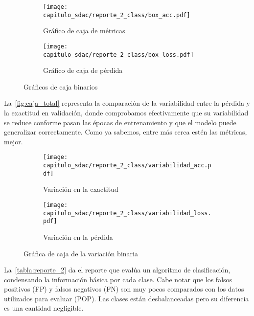 \begin{figure}[H]
    \centering
    \begin{subfigure}[b]{0.6\textwidth}
        \centering
        \texttt{[image: capitulo\_sdac/reporte\_2\_class/box\_acc.pdf]}
        \caption{Gráfico de caja de métricas}\label{fig:caja_acc2} 
    \end{subfigure}

    \begin{subfigure}[b]{0.6\textwidth}
        \centering
        \texttt{[image: capitulo\_sdac/reporte\_2\_class/box\_loss.pdf]}
        \caption{Gráfico de caja de pérdida}\label{fig:caja_loss2}
    \end{subfigure}
    \caption{Gráficos de caja binarios}\label{fig:caja_total2}
\end{figure}

La~\autoref{fig:caja_total} representa la comparación de la variabilidad entre
la pérdida y la exactitud en validación, donde comprobamos efectivamente que su
variabilidad se reduce conforme pasan las épocas de entrenamiento y que el
modelo puede generalizar correctamente. Como ya sabemos, entre más cerca estén
las métricas, mejor.

\begin{figure}[H]
    \centering
    \begin{subfigure}[b]{0.6\textwidth}
        \centering
        \texttt{[image: capitulo\_sdac/reporte\_2\_class/variabilidad\_acc.pdf]}
        \caption{Variación en la exactitud}\label{fig:caja_acc} 
    \end{subfigure}

    \begin{subfigure}[b]{0.6\textwidth}
        \centering
        \texttt{[image: capitulo\_sdac/reporte\_2\_class/variabilidad\_loss.pdf]}
        \caption{Variación en la pérdida}\label{fig:caja_loss}
    \end{subfigure}
    \caption{Gráfica de caja de la variación binaria}\label{fig:caja_total}
\end{figure}

La~\autoref{tabla:reporte_2} da el reporte que evalúa un algoritmo de
clasificación, condensando la información básica por cada clase. Cabe notar que
los falsos positivos (FP) y falsos negativos (FN) son muy pocos comparados con
los datos utilizados para evaluar (POP). Las clases están desbalanceadas pero su
diferencia es una cantidad negligible. 

